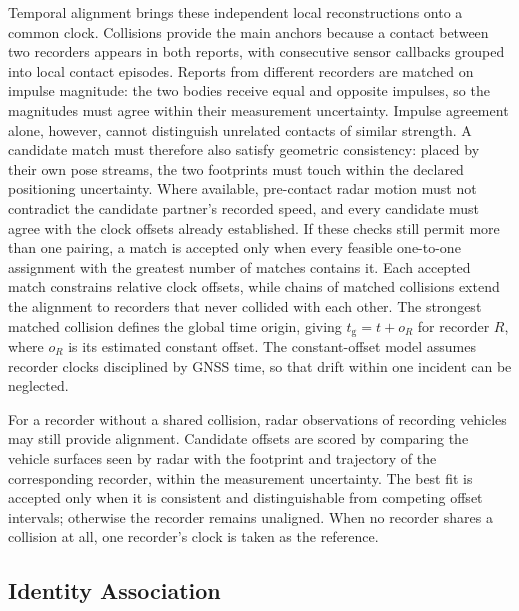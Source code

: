 Temporal alignment brings these independent local reconstructions onto
a common clock. Collisions provide the main anchors because a contact
between two recorders appears in both reports, with consecutive sensor
callbacks grouped into local contact episodes. Reports from different
recorders are matched on impulse magnitude: the two bodies receive equal
and opposite impulses, so the magnitudes must agree within their
measurement uncertainty. Impulse agreement alone, however, cannot
distinguish unrelated contacts of similar strength. A candidate match
must therefore also satisfy geometric consistency: placed by their own
pose streams, the two footprints must touch within the declared
positioning uncertainty. Where available, pre-contact radar motion must
not contradict the candidate partner's recorded speed, and every
candidate must agree with the clock offsets already established.
If these checks still permit more than one pairing, a match is accepted
only when every feasible one-to-one assignment with the greatest number
of matches contains it. Each accepted match constrains relative clock
offsets, while chains of matched collisions extend the alignment to
recorders that never collided with each other. The strongest matched
collision defines the global time origin, giving
$t_{\mathrm{g}}=t+o_R$ for recorder $R$, where $o_R$ is its
estimated constant offset. The constant-offset model assumes recorder
clocks disciplined by GNSS time, so that drift within one incident can
be neglected.

For a recorder without a shared collision, radar observations of
recording vehicles may still provide alignment. Candidate offsets are
scored by comparing the vehicle surfaces seen by radar with the footprint
and trajectory of the corresponding recorder, within the measurement
uncertainty. The best fit is accepted only when it is consistent and
distinguishable from competing offset intervals; otherwise the recorder
remains unaligned. When no recorder shares a collision at all, one
recorder's clock is taken as the reference.

\subsection{Identity Association}
\label{subsec:identity-association}

